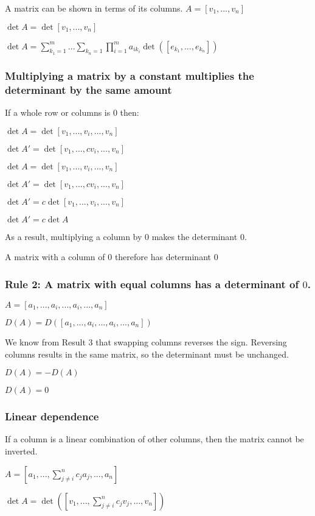 A matrix can be shown in terms of its columns.
$A=[v_1,...,v_n]$

$\det A=\det [v_1,...,v_n]$


$\det A=\sum_{k_1=1}^m...\sum_{k_n=1}\prod_{i=1}^ma_{ik_i}\det ([e_{k_1},...,e_{k_n}])$

\subsubsection{Multiplying a matrix by a constant multiplies the determinant by the same amount}

If a whole row or columns is \(0\) then:

$\det A=\det [v_1,...,v_i,...,v_n]$

$\det A'=\det [v_1,...,cv_i,...,v_n]$


$\det A=\det [v_1,...,v_i,...,v_n]$

$\det A'=\det [v_1,...,cv_i,...,v_n]$

$\det A'=c\det [v_1,...,v_i,...,v_n]$

$\det A'=c\det A$

As a result, multiplying a column by \(0\) makes the determinant \(0\).

A matrix with a column of \(0\) therefore has determinant \(0\)

\subsubsection{Rule 2: A matrix with equal columns has a determinant of \(0\).}

$A=[a_1,...,a_i,...,a_i,...,a_n]$

$D(A)=D([a_1,...,a_i,...,a_i,...,a_n])$

We know from Result 3 that swapping columns reverses the sign. Reversing columns results in the same matrix, so the determinant must be unchanged.

$D(A)=-D(A)$

$D(A)=0$

\subsubsection{Linear dependence}

If a column is a linear combination of other columns, then the matrix cannot be inverted.

$A=[a_1,...,\sum_{j\ne i}^{n}c_ja_j,...,a_n]$

$\det A=\det ([v_1,...,\sum_{j\ne i}^{n}c_jv_j,...,v_n])$

